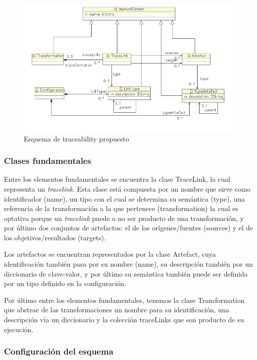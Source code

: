 \documentclass[a4paper,12pt,twoside,spanish,openright]{book}
\begin{document}
\begin{figure}[hbtp]
\centering
\includegraphics[scale=0.76]{./img/Esquema}
\caption{Esquema de traceability propuesto}
\label{fig:EsquenaPropuesto}
\end{figure}


\subsubsection{Clases fundamentales}

Entre los elementos fundamentales se encuentra la clase \textsf{TraceLink}, la cual representa un \textit{tracelink}. Esta clase está compuesta por un nombre que sirve como identificador (\textsf{name}), un tipo con el cual se determina su semántica (\textsf{type}), una referencia de la transformación a la que pertenece (\textsf{transformation}) la cual es optativa porque un \textit{tracelink} puede o no ser producto de una transformación, y por último dos conjuntos de artefactos: el de los orígenes/fuentes (\textsf{sources}) y el de los objetivos/resultados (\textsf{targets}).

Los artefactos se encuentran representados por la clase \textsf{Artefact}, cuya identificación también pasa por su nombre (\textsf{name}), su descripción también por un diccionario de clave-valor, y por último su semántica también puede ser definida por un tipo definido en la configuración.

Por último entre los elementos fundamentales, tenemos la clase \textsf{Transformation} que abstrae de las transformaciones un nombre para su identificación, una descripción vía un diccionario y la colección \textsf{traceLinks} que son producto de su ejecución.


\subsubsection{Configuración del esquema}
\end{document}
